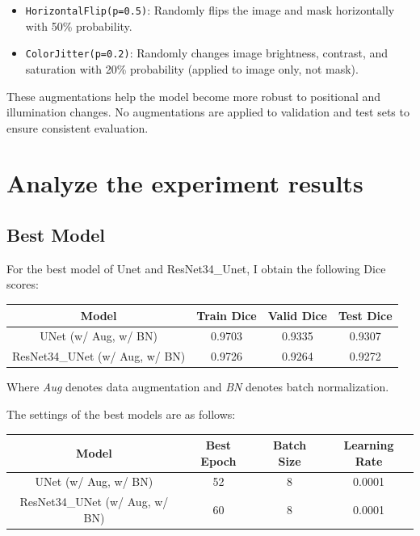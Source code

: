 \documentclass{homework}
\begin{document}
\begin{itemize}
    \item \lstinline{HorizontalFlip(p=0.5)}: Randomly flips the image and mask horizontally with 50\% probability.
    \item \lstinline{ColorJitter(p=0.2)}: Randomly changes image brightness, contrast, and saturation with 20\% probability (applied to image only, not mask).
\end{itemize}

These augmentations help the model become more robust to positional and illumination changes. No augmentations are applied to validation and test sets to ensure consistent evaluation.

\section{Analyze the experiment results}

\subsection{Best Model}

For the best model of Unet and ResNet34\_Unet, I obtain the following Dice scores:

\begin{table}[H]
    \centering
    \begin{tabular}{|c|c|c|c|}
        \hline
        Model & Train Dice & Valid Dice & Test Dice \\
        \hline
        UNet (w/ Aug, w/ BN) & 0.9703 & 0.9335 & 0.9307 \\
        ResNet34\_UNet (w/ Aug, w/ BN) & 0.9726 & 0.9264 & 0.9272 \\
        \hline
    \end{tabular}
\end{table}

Where \textit{Aug} denotes data augmentation and \textit{BN} denotes batch normalization.

The settings of the best models are as follows:

\begin{table}[H]
    \centering
    \begin{tabular}{|c|c|c|c|}
        \hline
        Model & Best Epoch & Batch Size & Learning Rate \\
        \hline
        UNet (w/ Aug, w/ BN) & 52 & 8 & 0.0001 \\
        ResNet34\_UNet (w/ Aug, w/ BN) & 60 & 8 & 0.0001 \\
        \hline
    \end{tabular}
\end{table}
\end{document}

